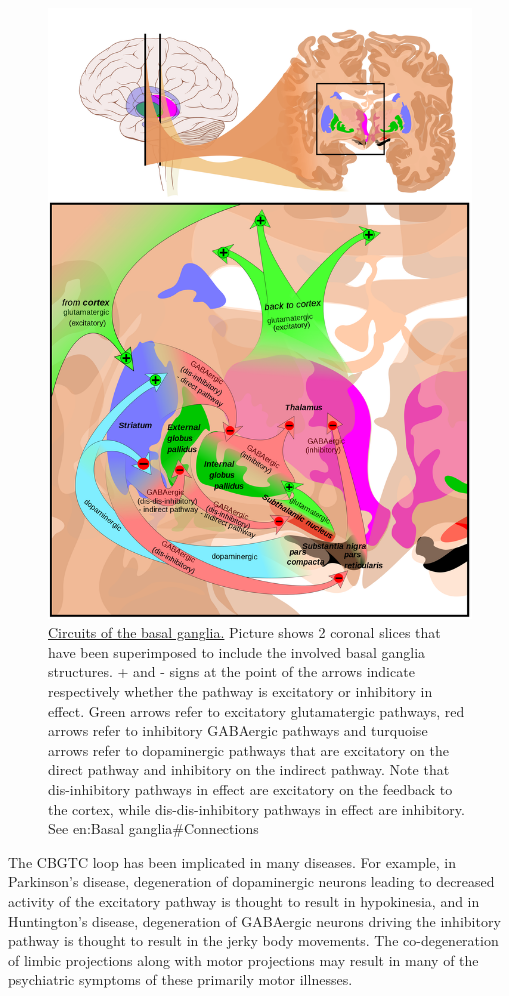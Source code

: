 \begin{figure}

{\centering \includegraphics[width=0.7\linewidth]{./figures/motor/Basal_ganglia_circuits} 

}

\caption{\href{https://commons.wikimedia.org/wiki/File:Basal_ganglia_circuits.svg}{Circuits of the basal ganglia.} Picture shows 2 coronal slices that have been superimposed to include the involved basal ganglia structures. + and - signs at the point of the arrows indicate respectively whether the pathway is excitatory or inhibitory in effect. Green arrows refer to excitatory glutamatergic pathways, red arrows refer to inhibitory GABAergic pathways and turquoise arrows refer to dopaminergic pathways that are excitatory on the direct pathway and inhibitory on the indirect pathway. Note that dis-inhibitory pathways in effect are excitatory on the feedback to the cortex, while dis-dis-inhibitory pathways in effect are inhibitory. See en:Basal ganglia\#Connections}\label{fig:basalcircuits}
\end{figure}

The CBGTC loop has been implicated in many diseases. For example, in Parkinson's disease, degeneration of dopaminergic neurons leading to decreased activity of the excitatory pathway is thought to result in hypokinesia, and in Huntington's disease, degeneration of GABAergic neurons driving the inhibitory pathway is thought to result in the jerky body movements. The co-degeneration of limbic projections along with motor projections may result in many of the psychiatric symptoms of these primarily motor illnesses.

